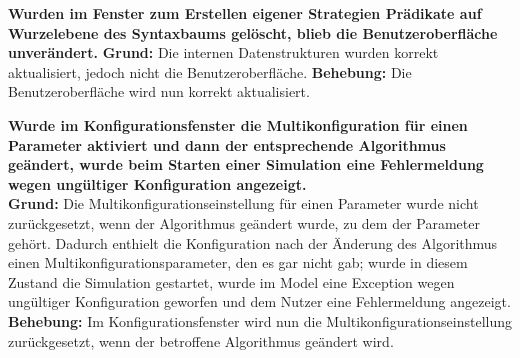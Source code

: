 \documentclass[parskip=full,11pt,openany]{scrreprt}
\begin{document}
\textbf{Wurden im Fenster zum Erstellen eigener Strategien Prädikate auf Wurzelebene des Syntaxbaums gelöscht, blieb die Benutzeroberfläche unverändert.} 
\newline
\textbf{Grund: } Die internen Datenstrukturen wurden  korrekt aktualisiert, jedoch nicht die Benutzeroberfläche.
\newline
\textbf{Behebung: } Die Benutzeroberfläche wird nun korrekt aktualisiert.

\textbf{Wurde im Konfigurationsfenster die Multikonfiguration für einen Parameter aktiviert und dann der entsprechende Algorithmus geändert, wurde beim Starten einer Simulation eine Fehlermeldung wegen ungültiger Konfiguration angezeigt.}\\
\textbf{Grund: } Die Multikonfigurationseinstellung für einen Parameter wurde nicht zurückgesetzt, wenn der Algorithmus geändert wurde, zu dem der Parameter gehört. Dadurch enthielt die Konfiguration nach der Änderung des Algorithmus einen Multikonfigurationsparameter, den es gar nicht gab; wurde in diesem Zustand die Simulation gestartet, wurde im Model eine Exception wegen ungültiger Konfiguration geworfen und dem Nutzer eine Fehlermeldung angezeigt.\\
\textbf{Behebung:} Im Konfigurationsfenster wird nun die Multikonfigurationseinstellung zurückgesetzt, wenn der betroffene Algorithmus geändert wird.
\end{document}
